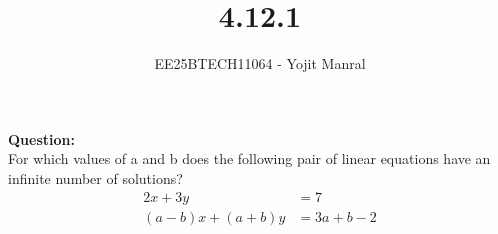 \documentclass[journal]{IEEEtran}
\begin{document}

\vspace{3cm}

\title{4.12.1}
\author{EE25BTECH11064 - Yojit Manral}

\maketitle
{\let\newpage\relax\maketitle}
\renewcommand{\thefigure}{\theenumi}
\renewcommand{\thetable}{\theenumi}
\setlength{\intextsep}{10pt} %

\textbf{Question:}\\
For which values of a and b does the following pair of linear equations have an
infinite number of solutions?
\begin{align*}
    2x + 3y &= 7 \\
    (a - b)x + (a + b)y &= 3a + b - 2
\end{align*}
\end{document}
